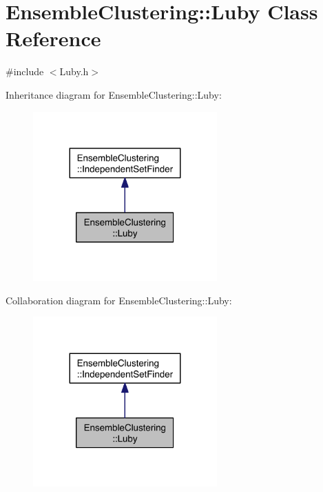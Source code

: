 \hypertarget{class_ensemble_clustering_1_1_luby}{\section{Ensemble\-Clustering\-:\-:Luby Class Reference}
\label{class_ensemble_clustering_1_1_luby}
}


{\ttfamily \#include $<$Luby.\-h$>$}



Inheritance diagram for Ensemble\-Clustering\-:\-:Luby\-:
\nopagebreak
\begin{figure}[H]
\begin{center}
\leavevmode
\includegraphics[width=200pt]{class_ensemble_clustering_1_1_luby__inherit__graph}
\end{center}
\end{figure}


Collaboration diagram for Ensemble\-Clustering\-:\-:Luby\-:
\nopagebreak
\begin{figure}[H]
\begin{center}
\leavevmode
\includegraphics[width=200pt]{class_ensemble_clustering_1_1_luby__coll__graph}
\end{center}
\end{figure}
